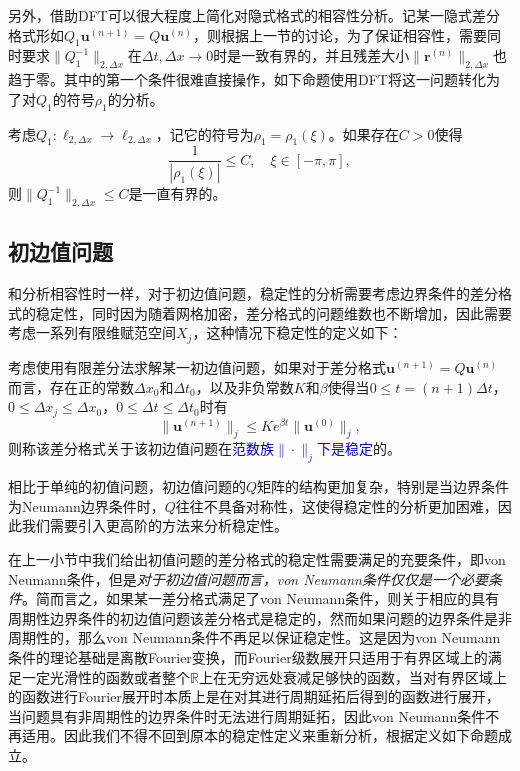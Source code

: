\documentclass[a4paper,10pt]{ctexart}
\begin{document}
另外，借助DFT可以很大程度上简化对隐式格式的相容性分析。记某一隐式差分格式形如$ Q_1 \bm{u}^{(n+1)} = Q \bm{u}^{(n)} $，则根据上一节的讨论，为了保证相容性，需要同时要求$ \| Q_1^{-1} \|_{2,\Delta x} $在$ \Delta t,\Delta x\to 0 $时是一致有界的，并且残差大小$ \| \bm{r}^{(n)} \|_{2,\Delta x} $也趋于零。其中的第一个条件很难直接操作，如下命题使用DFT将这一问题转化为了对$ Q_1 $的符号$ \rho_1 $的分析。
\begin{proposition}
    考虑$ Q_1:\ell_{2,\Delta x}\to \ell_{2,\Delta x} $，记它的符号为$ \rho_1 = \rho_1(\xi) $。如果存在$ C>0 $使得
    \begin{equation}
        \frac{1}{|\rho_1(\xi)|}\leqslant C,\quad \xi\in [-\pi,\pi],
    \end{equation}
    则$ \| Q_1^{-1} \|_{2,\Delta x} \leqslant C $是一直有界的。
\end{proposition}

\subsection{初边值问题}
和分析相容性时一样，对于初边值问题，稳定性的分析需要考虑边界条件的差分格式的稳定性，同时因为随着网格加密，差分格式的问题维数也不断增加，因此需要考虑一系列有限维赋范空间$ X_j $，这种情况下稳定性的定义如下：
\begin{definition}
    考虑使用有限差分法求解某一初边值问题，如果对于差分格式$ \bm{u}^{(n+1)} = Q \bm{u}^{(n)} $而言，存在正的常数$ \Delta x_0 $和$ \Delta t_0 $，以及非负常数$ K $和$ \beta $使得当$ 0\leqslant t=(n+1)\Delta t $，$ 0\leqslant \Delta x_j\leqslant \Delta x_0 $，$ 0\leqslant \Delta t\leqslant \Delta t_0 $时有
    \begin{equation}
        \| \bm{u}^{(n+1)} \|_j \leqslant K e^{\beta t} \| \bm{u}^{(0)} \|_j,
    \end{equation}
    则称该差分格式关于该初边值问题在\textcolor{blue}{范数族$ \| \cdot \|_j $下是稳定}的。
\end{definition}
相比于单纯的初值问题，初边值问题的$ Q $矩阵的结构更加复杂，特别是当边界条件为Neumann边界条件时，$ Q $往往不具备对称性，这使得稳定性的分析更加困难，因此我们需要引入更高阶的方法来分析稳定性。

在上一小节中我们给出初值问题的差分格式的稳定性需要满足的充要条件，即von Neumann条件，但是\emph{对于初边值问题而言，von Neumann条件仅仅是一个必要条件}。简而言之，如果某一差分格式满足了von Neumann条件，则关于相应的具有周期性边界条件的初边值问题该差分格式是稳定的，然而如果问题的边界条件是非周期性的，那么von Neumann条件不再足以保证稳定性。这是因为von Neumann条件的理论基础是离散Fourier变换，而Fourier级数展开只适用于有界区域上的满足一定光滑性的函数或者整个$ \mathbb{R} $上在无穷远处衰减足够快的函数，当对有界区域上的函数进行Fourier展开时本质上是在对其进行周期延拓后得到的函数进行展开，当问题具有非周期性的边界条件时无法进行周期延拓，因此von Neumann条件不再适用。因此我们不得不回到原本的稳定性定义来重新分析，根据定义如下命题成立。
\end{document}
